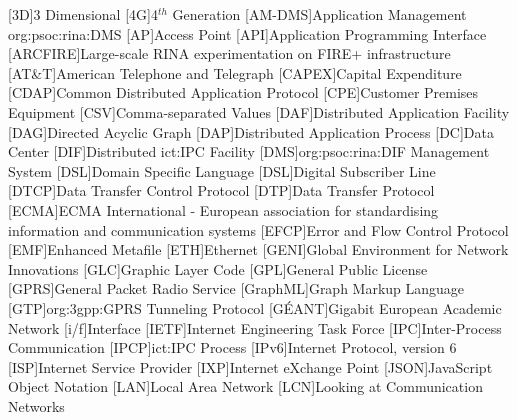 \begin{acronym}[ARCFIREX]
    [3D]{3 Dimensional}
    [4G]{4$^{th}$ Generation}
    [AM-DMS]{Application Management \acs{org:psoc:rina:DMS}}
    [AP]{Access Point}
    [API]{Application Programming Interface}
    [ARCFIRE]{Large-scale RINA experimentation on FIRE+ infrastructure}
    [AT\&T]{American Telephone and Telegraph}
    [CAPEX]{Capital Expenditure}
    [CDAP]{Common Distributed Application Protocol}
    [CPE]{Customer Premises Equipment}
    [CSV]{Comma-separated Values}
    [DAF]{Distributed Application Facility}
    [DAG]{Directed Acyclic Graph}
    [DAP]{Distributed Application Process}
    [DC]{Data Center}
    [DIF]{Distributed \acs{ict:IPC} Facility}
    [DMS]{\acs{org:psoc:rina:DIF} Management System}
    [DSL]{Domain Specific Language}
    [DSL]{Digital Subscriber Line}
    [DTCP]{Data Transfer Control Protocol}
    [DTP]{Data Transfer Protocol}
    [ECMA]{ECMA International - European association for standardising information and communication systems}
    [EFCP]{Error and Flow Control Protocol}
    [EMF]{Enhanced Metafile}
    [ETH]{Ethernet}
    [GENI]{Global Environment for Network Innovations}
    [GLC]{Graphic Layer Code}
    [GPL]{General Public License}
    [GPRS]{General Packet Radio Service}
    [GraphML]{Graph Markup Language}
    [GTP]{\acs{org:3gpp:GPRS} Tunneling Protocol}
    [GÉANT]{Gigabit European Academic Network}
    [i/f]{Interface}
    [IETF]{Internet Engineering Task Force}
    [IPC]{Inter-Process Communication}
    [IPCP]{\acs{ict:IPC} Process}
    [IPv6]{Internet Protocol, version 6}
    [ISP]{Internet Service Provider}
    [IXP]{Internet eXchange Point}
    [JSON]{JavaScript Object Notation}
    [LAN]{Local Area Network}
    [LCN]{Looking at Communication Networks}

\end{acronym}
